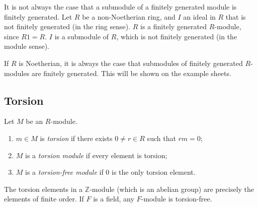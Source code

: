 \begin{example}
	It is not always the case that a submodule of a finitely generated module is finitely generated.
	Let \( R \) be a non-Noetherian ring, and \( I \) an ideal in \( R \) that is not finitely generated (in the ring sense).
	\( R \) is a finitely generated \( R \)-module, since \( R1 = R \).
	\( I \) is a submodule of \( R \), which is not finitely generated (in the module sense).
\end{example}
\begin{remark}
	If \( R \) is Noetherian, it is always the case that submodules of finitely generated \( R \)-modules are finitely generated.
	This will be shown on the example sheets.
\end{remark}

\subsection{Torsion}
\begin{definition}
	Let \( M \) be an \( R \)-module.
	\begin{enumerate}
		\item \( m \in M \) is \textit{torsion} if there exists \( 0 \neq r \in R \) such that \( rm = 0 \);
		\item \( M \) is a \textit{torsion module} if every element is torsion;
		\item \( M \) is a \textit{torsion-free module} if 0 is the only torsion element.
	\end{enumerate}
\end{definition}
\begin{example}
	The torsion elements in a \( \mathbb Z \)-module (which is an abelian group) are precisely the elements of finite order.
	If \( F \) is a field, any \( F \)-module is torsion-free.
\end{example}

